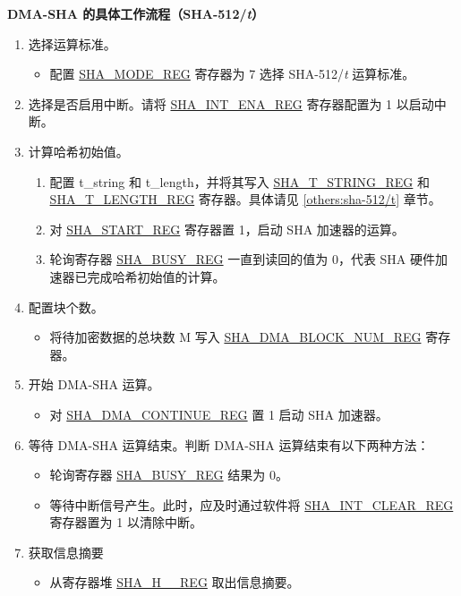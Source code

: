 \documentclass[main\_\_CN.tex]{subfiles}
\begin{document}
\textbf{DMA-SHA 的具体工作流程（SHA-512/{\it{t}}）}

\begin{enumerate}
    \item 选择运算标准。
        \begin{itemize}
            \item 配置 \hyperref[regdesc:SHAMODEREG]{SHA\_MODE\_REG} 寄存器为 7 选择 SHA-512/{\it{t}} 运算标准。
        \end{itemize}
        
    \item 选择是否启用中断。请将 \hyperref[regdesc:SHAINTENAREG]{SHA\_INT\_ENA\_REG} 寄存器配置为 1 以启动中断。
    
    \item 计算哈希初始值。
        \begin{enumerate}
            \item 配置 t\_string 和 t\_length，并将其写入 \hyperref[regdesc:SHATSTRINGREG]{SHA\_T\_STRING\_REG} 和 \hyperref[regdesc:SHATLENGTHREG]{SHA\_T\_LENGTH\_REG} 寄存器。具体请见 \ref{others:sha-512/t} 章节。
            \item 对 \hyperref[regdesc:SHASTARTREG]{SHA\_START\_REG} 寄存器置 1，启动 SHA 加速器的运算。
            \item 轮询寄存器 \hyperref[regdesc:SHABUSYREG]{SHA\_BUSY\_REG} 一直到读回的值为 0，代表 SHA 硬件加速器已完成哈希初始值的计算。
        \end{enumerate}
        
    \item 配置块个数。
        \begin{itemize}
            \item 将待加密数据的总块数 M 写入  \hyperref[regdesc:SHADMABLOCKNUMREG]{SHA\_DMA\_BLOCK\_NUM\_REG} 寄存器。
        \end{itemize}
        
    \item 开始 DMA-SHA 运算。
        \begin{itemize}
            \item 对 \hyperref[regdesc:SHADMACONTINUEREG]{SHA\_DMA\_CONTINUE\_REG} 置 1 启动 SHA 加速器。
        \end{itemize}
        
    \item 等待 DMA-SHA 运算结束。判断 DMA-SHA 运算结束有以下两种方法：
        \begin{itemize}
            \item 轮询寄存器 \hyperref[regdesc:SHABUSYREG]{SHA\_BUSY\_REG} 结果为 0。
            \item 等待中断信号产生。此时，应及时通过软件将 \hyperref[regdesc:SHAINTCLEARREG]{SHA\_INT\_CLEAR\_REG} 寄存器置为 1 以清除中断。
        \end{itemize} 
        
    \item 获取信息摘要
        \begin{itemize}
            \item 从寄存器堆 \hyperref[regdesc:SHAHNREG]{SHA\_H\_\_REG} 取出信息摘要。
        \end{itemize}
\end{enumerate}
\end{document}
